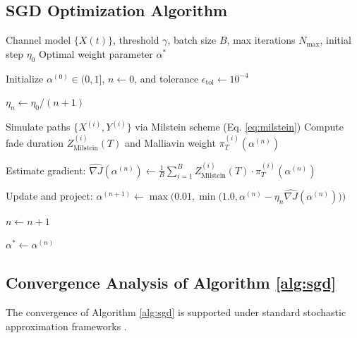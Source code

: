 \documentclass[11pt]{article}
\begin{document}
\subsection{SGD Optimization Algorithm}\label{sec:algorithm}
\begin{algorithm}
\caption{Malliavin-Enhanced SGD Parameter Estimation}
\label{alg:sgd}
\begin{algorithmic}[1]
    \Require Channel model $\{X(t)\}$, threshold $\gamma$, batch size $B$, max iterations $N_{\max}$, initial step $\eta_0$
    \Ensure Optimal weight parameter $\alpha^*$
    
    \State Initialize $\alpha^{(0)} \in (0, 1]$, $n \gets 0$, and tolerance $\epsilon_{\text{tol}} \gets 10^{-4}$
    
        \State $\eta_n \gets \eta_0 / (n+1)$ 
        
         
            \State Simulate paths $\{X^{(i)}, Y^{(i)}\}$ via Milstein scheme (Eq. \ref{eq:milstein})
            \State Compute fade duration $Z_{\text{Milstein}}^{(i)}(T)$ and Malliavin weight $\pi_T^{(i)}(\alpha^{(n)})$
        \EndFor
        
        \State Estimate gradient: $\widehat{\nabla J}(\alpha^{(n)}) \gets \frac{1}{B}\sum_{i=1}^B Z_{\text{Milstein}}^{(i)}(T) \cdot \pi_T^{(i)}(\alpha^{(n)})$
        
        \State Update and project: $\alpha^{(n+1)} \gets \max\Big(0.01, \min\big(1.0, \alpha^{(n)} - \eta_n \widehat{\nabla J}(\alpha^{(n)})\big)\Big)$
        
        \State $n \gets n + 1$
    \EndWhile
    
    \State \Return $\alpha^* \gets \alpha^{(n)}$
\end{algorithmic}
\end{algorithm}

\subsection{Convergence Analysis of Algorithm \ref{alg:sgd}}
\label{subsec:sgd_convergence}

The convergence of Algorithm \ref{alg:sgd} is supported under standard stochastic approximation frameworks \citet{Robbins1951, Polyak1987, Spall1998}. 
\end{document}
